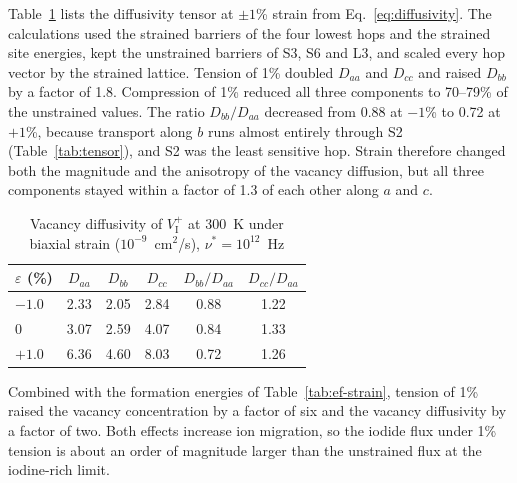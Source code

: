 Table~\ref{tab:tensor-strain} lists the diffusivity tensor at $\pm1$\% strain from Eq.~\ref{eq:diffusivity}. The calculations used the strained barriers of the four lowest hops and the strained site energies, kept the unstrained barriers of S3, S6 and L3, and scaled every hop vector by the strained lattice. Tension of 1\% doubled $D_{aa}$ and $D_{cc}$ and raised $D_{bb}$ by a factor of 1.8. Compression of 1\% reduced all three components to 70--79\% of the unstrained values. The ratio $D_{bb}/D_{aa}$ decreased from 0.88 at $-1$\% to 0.72 at $+1$\%, because transport along $b$ runs almost entirely through S2 (Table~\ref{tab:tensor}), and S2 was the least sensitive hop. Strain therefore changed both the magnitude and the anisotropy of the vacancy diffusion, but all three components stayed within a factor of 1.3 of each other along $a$ and $c$.

\begin{table}[htbp]
  \centering
  \caption{Vacancy diffusivity of $V_\mathrm{I}^{+}$ at 300~K under biaxial strain ($10^{-9}$~cm$^2$/s), $\nu^{*} = 10^{12}$~Hz}
  \label{tab:tensor-strain}
  \begin{tabular}{lccccc}
    \toprule
    $\varepsilon$ (\%) & $D_{aa}$ & $D_{bb}$ & $D_{cc}$ & $D_{bb}/D_{aa}$ & $D_{cc}/D_{aa}$ \\
    \midrule
    $-1.0$ & 2.33 & 2.05 & 2.84 & 0.88 & 1.22 \\
    0 & 3.07 & 2.59 & 4.07 & 0.84 & 1.33 \\
    $+1.0$ & 6.36 & 4.60 & 8.03 & 0.72 & 1.26 \\
    \bottomrule
  \end{tabular}
\end{table}

Combined with the formation energies of Table~\ref{tab:ef-strain}, tension of 1\% raised the vacancy concentration by a factor of six and the vacancy diffusivity by a factor of two. Both effects increase ion migration, so the iodide flux under 1\% tension is about an order of magnitude larger than the unstrained flux at the iodine-rich limit.

